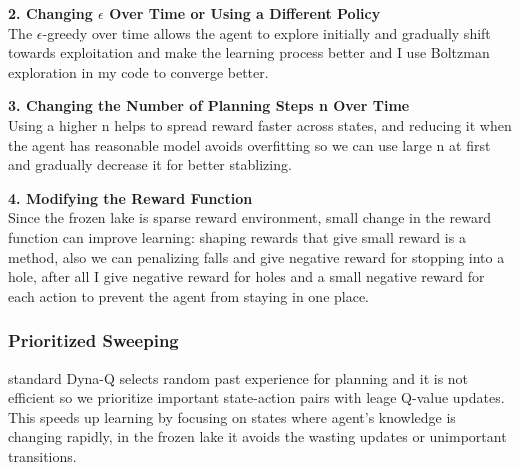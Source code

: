 \textbf{2. Changing $\epsilon$ Over Time or Using a Different Policy}\\
The $\epsilon$-greedy over time allows the agent to explore initially and gradually shift towards exploitation and make the learning process better and I use Boltzman exploration in my code to converge better.
 
\textbf{3. Changing the Number of Planning Steps n Over Time}\\
Using a higher n helps to spread reward faster across states, and reducing it when the agent has reasonable model avoids overfitting so we can use large n at first and gradually decrease it for better stablizing.

\textbf{4. Modifying the Reward Function}\\
Since the frozen lake is sparse reward environment, small change in the reward function can improve learning: shaping rewards that give small reward is a method, also we can penalizing falls and give negative reward for stopping into a hole, after all I give negative reward for holes and a small negative reward for each action to prevent the agent from staying in one place.
 
\subsubsection{Prioritized Sweeping}
standard Dyna-Q selects random past experience for planning and it is not efficient so we prioritize important state-action pairs with leage Q-value updates.
This speeds up learning by focusing on states where agent's knowledge is changing rapidly, in the frozen lake it avoids the wasting updates or unimportant transitions.